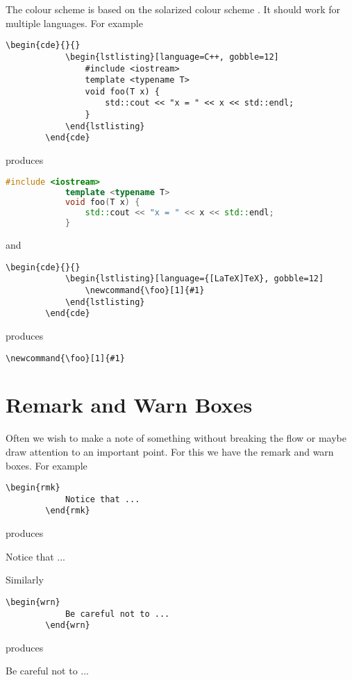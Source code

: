 \documentclass[fleqn, a4paper, openany]{memoir}
\begin{document}
    The colour scheme is based on the solarized colour scheme \cite{solarized}.
    It should work for multiple languages.
    For example
    \begin{Verbatim}[gobble=2]
        \begin{cde}{}{}
            \begin{lstlisting}[language=C++, gobble=12]
                #include <iostream>
                template <typename T>
                void foo(T x) {
                    std::cout << "x = " << x << std::endl;
                }
            \end{lstlisting}
        \end{cde}
    \end{Verbatim}
    produces
    \begin{cde}{}{}
        \begin{lstlisting}[language=C++, gobble=12]
            #include <iostream>
            template <typename T>
            void foo(T x) {
                std::cout << "x = " << x << std::endl;
            }
        \end{lstlisting}
    \end{cde}
    and
    \begin{Verbatim}[gobble=2]
        \begin{cde}{}{}
            \begin{lstlisting}[language={[LaTeX]TeX}, gobble=12]
                \newcommand{\foo}[1]{#1}
            \end{lstlisting}
        \end{cde}
    \end{Verbatim}
    produces
    \begin{cde}{}{}
        \begin{lstlisting}[language={[LaTeX]TeX}, gobble=12]
            \newcommand{\foo}[1]{#1}
        \end{lstlisting}
    \end{cde}

    \section{Remark and Warn Boxes}
    Often we wish to make a note of something without breaking the flow or maybe draw attention to an important point.
    For this we have the remark and warn boxes.
    For example
    \begin{Verbatim}[gobble=2]
        \begin{rmk}
            Notice that ...
        \end{rmk}
    \end{Verbatim}
    produces
    \begin{rmk}
        Notice that ...
    \end{rmk}
    Similarly
    \begin{Verbatim}[gobble=2]
        \begin{wrn}
            Be careful not to ...
        \end{wrn}
    \end{Verbatim}
    produces
    \begin{wrn}
        Be careful not to ...
    \end{wrn}
    
\end{document}

